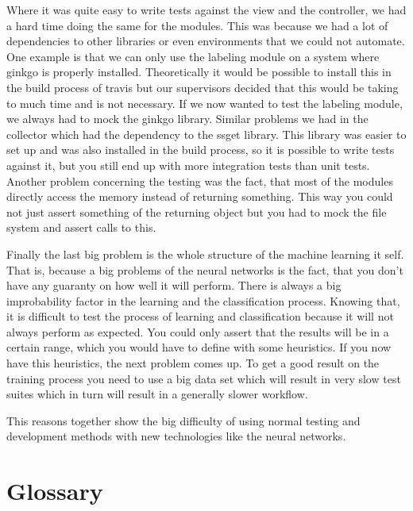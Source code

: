 \documentclass[parskip=full]{scrartcl}
\begin{document}
Where it was quite easy to write tests against the view and the controller, we had a hard time doing the same for the modules.
This was because we had a lot of dependencies to other libraries or even environments that we could not automate.
One example is that we can only use the labeling module on a system where \gls{ginkgo} is properly installed.
Theoretically it would be possible to install this in the build process of \gls{travis} but our supervisors decided that this would be taking to much time and is not necessary.
If we now wanted to test the labeling module, we always had to mock the \gls{ginkgo} library.
Similar problems we had in the collector which had the dependency to the \gls{ssget} library.
This library was easier to set up and was also installed in the build process, so it is possible to write tests against it, but you still end up with more integration tests than unit tests.
Another problem concerning the testing was the fact, that most of the modules directly access the memory instead of returning something.
This way you could not just assert something of the returning object but you had to mock the file system and assert calls to this.


Finally the last big problem is the whole structure of the machine learning it self.
That is, because a big problems of the neural networks is the fact, that you don't have any guaranty on how well it will perform.
There is always a big improbability factor in the learning and the classification process.
Knowing that, it is difficult to test the process of learning and classification because it will not always perform as expected.
You could only assert that the results will be in a certain range, which you would have to define with some heuristics.
If you now have this heuristics, the next problem comes up.
To get a good result on the training process you need to use a big data set which will result in very slow test suites which in turn will result in a generally slower workflow.


This reasons together show the big difficulty of using normal testing and development methods with new technologies like the neural networks.

\newpage

\section{Glossary}

%
\printnoidxglossaries
\end{document}
